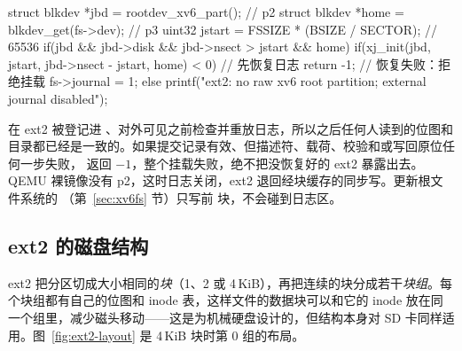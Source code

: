 \begin{ccode}
struct blkdev *jbd = rootdev_xv6_part();                   // p2
struct blkdev *home = blkdev_get(fs->dev);                 // p3
uint32 jstart = FSSIZE * (BSIZE / SECTOR);                 // 65536
if(jbd && jbd->disk && jbd->nsect > jstart && home){
  if(xj_init(jbd, jstart, jbd->nsect - jstart, home) < 0)  // 先恢复日志
    return -1;                                             // 恢复失败：拒绝挂载
  fs->journal = 1;
} else
  printf("ext2: no raw xv6 root partition; external journal disabled\n");
\end{ccode}

 在 ext2 被登记进 、对外可见之前检查并重放日志，所以之后任何人读到的位图和目录都已经是一致的。如果提交记录有效、但描述符、载荷、校验和或写回原位任何一步失败， 返回 $-1$，整个挂载失败，绝不把没恢复好的 ext2 暴露出去。QEMU 裸镜像没有 p2，这时日志关闭，ext2 退回经块缓存的同步写。更新根文件系统的 （第~\ref{sec:xv6fs} 节）只写前  块，不会碰到日志区。

\subsection{ext2 的磁盘结构}

ext2 把分区切成大小相同的\emph{块}（1、2 或 4\,KiB），再把连续的块分成若干\emph{块组}。每个块组都有自己的位图和 inode 表，这样文件的数据块可以和它的 inode 放在同一个组里，减少磁头移动——这是为机械硬盘设计的，但结构本身对 SD 卡同样适用。图~\ref{fig:ext2-layout} 是 4\,KiB 块时第 0 组的布局。

